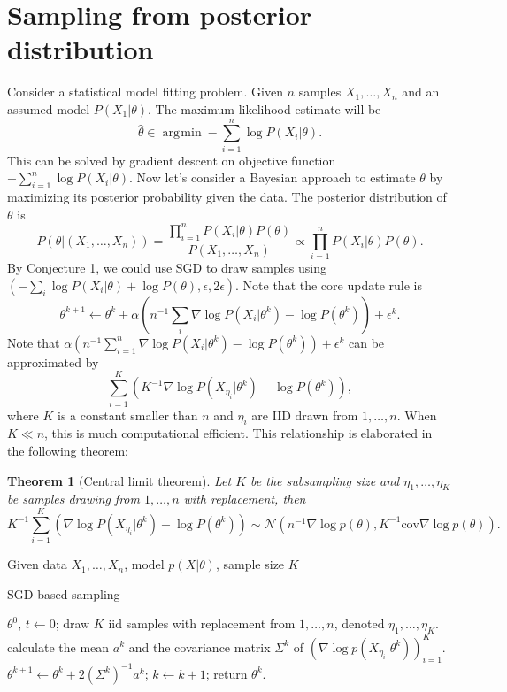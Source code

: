\documentclass[preprint,12pt,3p]{elsarticle}
\newcommand{\N}{\mathscr{N}}
\newcommand{\cov}{\mathrm{cov}}
\DeclareMathOperator*{\argmin}{\arg\!\min}
\newtheorem{theorem}{Theorem}
\begin{document}
\section{Sampling from posterior distribution}
Consider a statistical model fitting problem. Given $n$ samples $X_1,\ldots, X_n$ and an assumed model $P(X_1|\theta)$. The maximum likelihood estimate will be
\[
\hat{\theta} \in \argmin - \sum_{i=1}^n \log P(X_i|\theta).
\]
This can be solved by gradient descent on objective function $- \sum_{i=1}^n \log P(X_i|\theta)$. Now let's consider a Bayesian approach to estimate $\theta$ by maximizing its posterior probability given the data. The posterior distribution of $\theta$ is
\[
P(\theta|(X_1,\ldots, X_n)) = \frac{\prod_{i=1}^n P(X_i|\theta) P(\theta)}{P(X_1,\ldots, X_n)} \propto \prod_{i=1}^n P(X_i|\theta) P(\theta).
\]
By Conjecture 1, we could use SGD to draw samples using $(-\sum_i \log P(X_i|\theta) + \log P(\theta), \epsilon, 2\epsilon)$.  Note that the core update rule is
\[
\theta^{k+1} \gets \theta^{k} + \alpha (n^{-1} \sum_i \nabla \log P(X_i|\theta^k) - \log P(\theta^k)) + \epsilon^k.
\]
Note that $\alpha (n^{-1} \sum_{i=1}^n \nabla \log P(X_i|\theta^k) - \log P(\theta^k)) + \epsilon^k$ can be approximated by
\[
\sum_{i=1}^K (K^{-1} \nabla \log P(X_{\eta_i}|\theta^k) - \log P(\theta^k)),
\]
where $K$ is a constant smaller than $n$ and $\eta_i$ are IID drawn from $1,\ldots, n$. When $K\ll n$, this is much computational efficient. This relationship is elaborated in the following theorem:
\begin{theorem}[Central limit theorem]
Let $K$ be the subsampling size and $\eta_1,\ldots, \eta_K$ be samples drawing from $1,\ldots, n$ with replacement, then
\[
K^{-1}\sum_{i=1}^K (\nabla \log P(X_{\eta_i}|\theta^k) - \log P(\theta^k)) \sim \N(n^{-1} \nabla \log p(\theta) , K^{-1}\cov \nabla \log p(\theta)).
\]
\end{theorem}

\begin{algorithm}
{\small
Given data $X_1,\ldots, X_n$, model $p(X|\theta)$, sample size $K$
\begin{algorithmic}\caption{SGD based sampling}\label{Alg:SGD_Sampling}
 $ \theta^0$, $t \gets 0$;
\STATE draw $K$ iid samples with replacement from $1,\ldots, n$, denoted $\eta_1,\ldots, \eta_K$.
\STATE calculate the mean $a^k$ and the covariance matrix $\Sigma^k$ of $(\nabla\log p(X_{\eta_i}|\theta^k))_{i=1}^K$.
\STATE
$\theta^{k+1} \gets \theta^k + 2(\Sigma^k)^{-1}a^k$;
\STATE $k\gets k+1$;
\ENDWHILE
\STATE return $\theta^k$.
\end{algorithmic}}
\end{algorithm}
\end{document}
